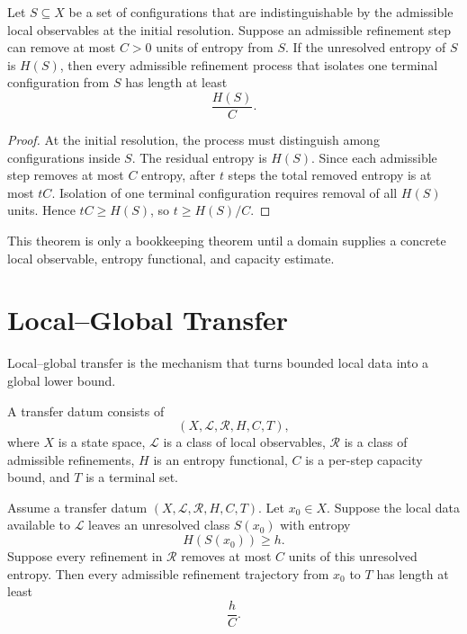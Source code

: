 \begin{theorem}
Let \(S\subseteq X\) be a set of configurations that are indistinguishable by
the admissible local observables at the initial resolution. Suppose an
admissible refinement step can remove at most \(C>0\) units of entropy from
\(S\). If the unresolved entropy of \(S\) is \(H(S)\), then every admissible
refinement process that isolates one terminal configuration from \(S\) has
length at least
\[
\frac{H(S)}{C}.
\]
\end{theorem}

\begin{proof}
At the initial resolution, the process must distinguish among configurations
inside \(S\). The residual entropy is \(H(S)\). Since each admissible step
removes at most \(C\) entropy, after \(t\) steps the total removed entropy is
at most \(tC\). Isolation of one terminal configuration requires removal of
all \(H(S)\) units. Hence \(tC\ge H(S)\), so \(t\ge H(S)/C\).
\end{proof}

This theorem is only a bookkeeping theorem until a domain supplies a concrete
local observable, entropy functional, and capacity estimate.

\section{Local--Global Transfer}

Local--global transfer is the mechanism that turns bounded local data into a
global lower bound.

\begin{definition}
A transfer datum consists of
\[
(X,\mathcal L,\mathcal R,H,C,T),
\]
where \(X\) is a state space, \(\mathcal L\) is a class of local observables,
\(\mathcal R\) is a class of admissible refinements, \(H\) is an entropy
functional, \(C\) is a per-step capacity bound, and \(T\) is a terminal set.
\end{definition}

\begin{theorem}
Assume a transfer datum \((X,\mathcal L,\mathcal R,H,C,T)\). Let \(x_0\in X\).
Suppose the local data available to \(\mathcal L\) leaves an unresolved class
\(S(x_0)\) with entropy
\[
H(S(x_0))\ge h.
\]
Suppose every refinement in \(\mathcal R\) removes at most \(C\) units of this
unresolved entropy. Then every admissible refinement trajectory from \(x_0\)
to \(T\) has length at least
\[
\frac{h}{C}.
\]
\end{theorem}

